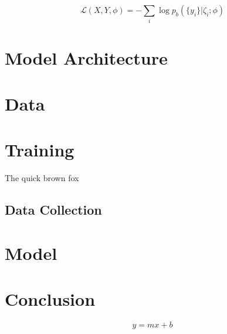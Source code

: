 \[
\mathcal{L}(X,Y,\phi) = -\sum_{i} \log p_b(\{y_i\}|\zeta_i;\phi)
\]



\section{Model Architecture}
\section{Data}
\section{Training}

\lipsum[12]
\begin{table}
  \centering
  \caption{The quick brown fox}
  
\end{table}
\lipsum[13]
\subsection{Data Collection}
\lipsum[16]
\section{Model}
\section{Conclusion}
\lipsum[20]
\begin{equation}
  y = mx + b
\end{equation}
\lipsum[22-25]